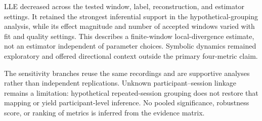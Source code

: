 LLE decreased across the tested window, label, reconstruction, and estimator settings. It retained the strongest inferential support in the hypothetical-grouping analysis, while its effect magnitude and number of accepted windows varied with fit and quality settings. This describes a finite-window local-divergence estimate, not an estimator independent of parameter choices. Symbolic dynamics remained exploratory and offered directional context outside the primary four-metric claim.

The sensitivity branches reuse the same recordings and are supportive analyses rather than independent replications. Unknown participant--session linkage remains a limitation: hypothetical repeated-session grouping does not restore that mapping or yield participant-level inference. No pooled significance, robustness score, or ranking of metrics is inferred from the evidence matrix.


